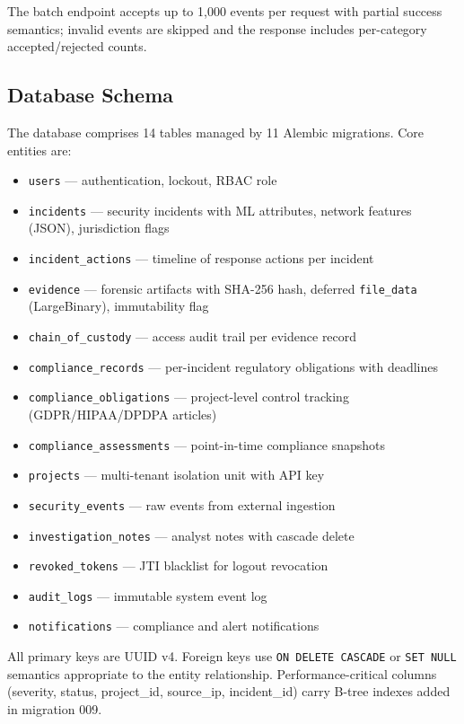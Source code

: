 \documentclass[conference]{IEEEtran}
\begin{document}
The batch endpoint accepts up to 1,000 events per request with partial success semantics; invalid events are skipped and the response includes per-category accepted/rejected counts.

\subsection{Database Schema}

The database comprises 14 tables managed by 11 Alembic migrations. Core entities are:

\begin{itemize}
    \item \texttt{users} — authentication, lockout, RBAC role
    \item \texttt{incidents} — security incidents with ML attributes, network features (JSON), jurisdiction flags
    \item \texttt{incident\_actions} — timeline of response actions per incident
    \item \texttt{evidence} — forensic artifacts with SHA-256 hash, deferred \texttt{file\_data} (LargeBinary), immutability flag
    \item \texttt{chain\_of\_custody} — access audit trail per evidence record
    \item \texttt{compliance\_records} — per-incident regulatory obligations with deadlines
    \item \texttt{compliance\_obligations} — project-level control tracking (GDPR/HIPAA/DPDPA articles)
    \item \texttt{compliance\_assessments} — point-in-time compliance snapshots
    \item \texttt{projects} — multi-tenant isolation unit with API key
    \item \texttt{security\_events} — raw events from external ingestion
    \item \texttt{investigation\_notes} — analyst notes with cascade delete
    \item \texttt{revoked\_tokens} — JTI blacklist for logout revocation
    \item \texttt{audit\_logs} — immutable system event log
    \item \texttt{notifications} — compliance and alert notifications
\end{itemize}

All primary keys are UUID v4. Foreign keys use \texttt{ON DELETE CASCADE} or \texttt{SET NULL} semantics appropriate to the entity relationship. Performance-critical columns (severity, status, project\_id, source\_ip, incident\_id) carry B-tree indexes added in migration 009.
\end{document}
